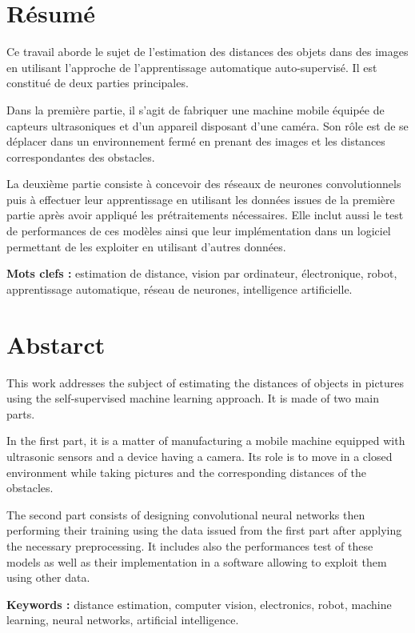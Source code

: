 \begin{titlepage}

  \vspace*{\fill}

  \section*{\LARGE Résumé}

  Ce travail aborde le sujet de l'estimation des distances des objets dans des images
  en utilisant l'approche de l'apprentissage automatique auto-supervisé.
  Il est constitué de deux parties principales.

  Dans la première partie, il s'agit de fabriquer une machine mobile équipée de
  capteurs ultrasoniques et d'un appareil disposant d'une caméra. Son rôle
  est de se déplacer dans un environnement fermé en prenant des images et les
  distances correspondantes des obstacles.

  La deuxième partie consiste à concevoir des réseaux de neurones convolutionnels
  puis à effectuer leur apprentissage en utilisant les données issues de la première
  partie après avoir appliqué les prétraitements nécessaires. Elle inclut aussi
  le test de performances de ces modèles ainsi que leur implémentation dans un
  logiciel permettant de les exploiter en utilisant d'autres données.

  \textbf{Mots clefs :} estimation de distance, vision par ordinateur,
  électronique, robot, apprentissage automatique, réseau de neurones, intelligence artificielle.

  \vspace{0.5em}

  \section*{\LARGE Abstarct}

  This work addresses the subject of estimating the distances of objects in pictures
  using the self-supervised machine learning approach. It is made of two main parts.

  In the first part, it is a matter of manufacturing a mobile machine equipped with
  ultrasonic sensors and a device having a camera. Its role is to move in a closed
  environment while taking pictures and the corresponding distances of the obstacles.

  The second part consists of designing convolutional neural networks then performing
  their training using the data issued from the first part after applying the
  necessary preprocessing. It includes also the performances test of these models
  as well as their implementation in a software allowing to exploit them using
  other data.

  \textbf{Keywords :} distance estimation, computer vision,
  electronics, robot, machine learning, neural networks, artificial intelligence.

  \vspace*{\fill}

\end{titlepage}
\restoregeometry
